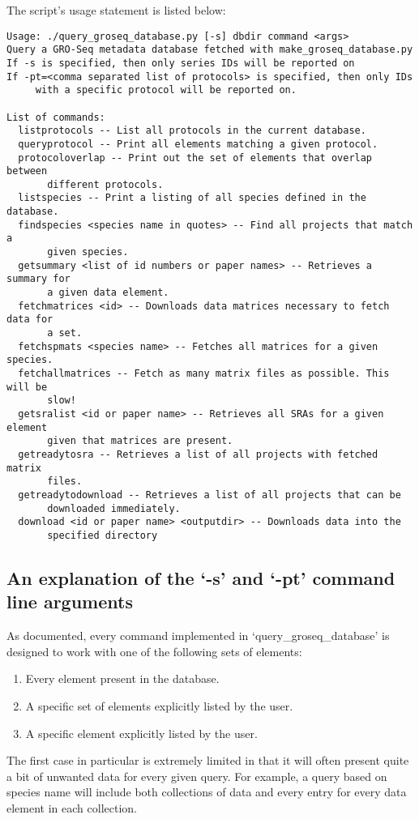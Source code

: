 \documentclass[12pt,letterpaper]{article}
\begin{document}
The script's usage statement is listed below:
\begin{verbatim}
Usage: ./query_groseq_database.py [-s] dbdir command <args>
Query a GRO-Seq metadata database fetched with make_groseq_database.py
If -s is specified, then only series IDs will be reported on
If -pt=<comma separated list of protocols> is specified, then only IDs 
     with a specific protocol will be reported on.

List of commands:
  listprotocols -- List all protocols in the current database.
  queryprotocol -- Print all elements matching a given protocol.
  protocoloverlap -- Print out the set of elements that overlap between 
       different protocols.
  listspecies -- Print a listing of all species defined in the database.
  findspecies <species name in quotes> -- Find all projects that match a 
       given species.
  getsummary <list of id numbers or paper names> -- Retrieves a summary for 
       a given data element.
  fetchmatrices <id> -- Downloads data matrices necessary to fetch data for 
       a set.
  fetchspmats <species name> -- Fetches all matrices for a given species.
  fetchallmatrices -- Fetch as many matrix files as possible. This will be 
       slow!
  getsralist <id or paper name> -- Retrieves all SRAs for a given element 
       given that matrices are present.
  getreadytosra -- Retrieves a list of all projects with fetched matrix 
       files.
  getreadytodownload -- Retrieves a list of all projects that can be 
       downloaded immediately.
  download <id or paper name> <outputdir> -- Downloads data into the 
       specified directory
\end{verbatim}

\subsection{An explanation of the `-s' and `-pt' command line arguments}
As documented, every command implemented in `query\_groseq\_database' is designed to work with one of the following sets of 
elements:
\begin{enumerate}
 \item Every element present in the database.
 \item A specific set of elements explicitly listed by the user.
 \item A specific element explicitly listed by the user.
\end{enumerate}

The first case in particular is extremely limited in that it will often present quite a bit of unwanted data for every given query. For example,
a query based on species name will include both collections of data and every entry for every data element in each collection.
\end{document}
